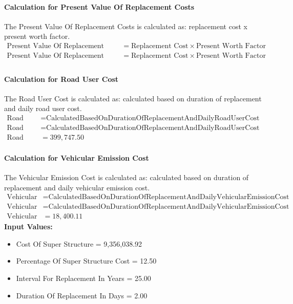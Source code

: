 \documentclass{article}
\begin{document}
 \paragraph{Calculation for Present Value Of Replacement Costs} 
The Present Value Of Replacement Costs is calculated as: replacement cost x present worth factor.
\begin{align*}
 \text{Present Value Of Replacement Costs} &= \text{Replacement Cost} \times \text{Present Worth Factor} \\
 \text{Present Value Of Replacement Costs} &= \text{Replacement Cost} \times \text{Present Worth Factor} \\
\end{align*}
 \paragraph{Calculation for Road User Cost} 
The Road User Cost is calculated as: calculated based on duration of replacement and daily road user cost.
\begin{align*}
 \text{Road User Cost} &= \text{Calculated} \text{Based} \text{On} \text{Duration} \text{Of} \text{Replacement} \text{And} \text{Daily} \text{Road} \text{User} \text{Cost} \\
 \text{Road User Cost} &= \text{Calculated} \text{Based} \text{On} \text{Duration} \text{Of} \text{Replacement} \text{And} \text{Daily} \text{Road} \text{User} \text{Cost} \\
 \text{Road User Cost} &= 399,747.50 
\end{align*}
 \paragraph{Calculation for Vehicular Emission Cost} 
The Vehicular Emission Cost is calculated as: calculated based on duration of replacement and daily vehicular emission cost.
\begin{align*}
 \text{Vehicular Emission Cost} &= \text{Calculated} \text{Based} \text{On} \text{Duration} \text{Of} \text{Replacement} \text{And} \text{Daily} \text{Vehicular} \text{Emission} \text{Cost} \\
 \text{Vehicular Emission Cost} &= \text{Calculated} \text{Based} \text{On} \text{Duration} \text{Of} \text{Replacement} \text{And} \text{Daily} \text{Vehicular} \text{Emission} \text{Cost} \\
 \text{Vehicular Emission Cost} &= 18,400.11 
\end{align*}
\textbf{Input Values:}
\begin{itemize}
\item Cost Of Super Structure = 9,356,038.92
\item Percentage Of Super Structure Cost = 12.50
\item Interval For Replacement In Years = 25.00
\item Duration Of Replacement In Days = 2.00
\end{itemize}
\end{document}

